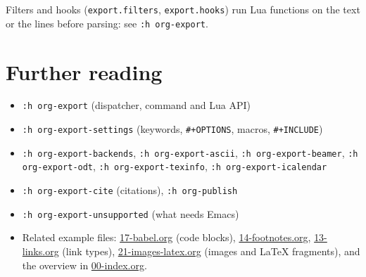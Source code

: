 Filters and hooks (\texttt{export.filters}, \texttt{export.hooks}) run Lua functions on
the text or the lines before parsing: see \texttt{:h org-export}.
\section{Further reading}
\label{sec:org7d8833a}
\begin{itemize}
\item \texttt{:h org-export} (dispatcher, command and Lua API)
\item \texttt{:h org-export-settings} (keywords, \texttt{\#+OPTIONS}, macros, \texttt{\#+INCLUDE})
\item \texttt{:h org-export-backends}, \texttt{:h org-export-ascii}, \texttt{:h org-export-beamer},
\texttt{:h org-export-odt}, \texttt{:h org-export-texinfo}, \texttt{:h org-export-icalendar}
\item \texttt{:h org-export-cite} (citations), \texttt{:h org-publish}
\item \texttt{:h org-export-unsupported} (what needs Emacs)
\item Related example files: \href{17-babel.org}{17-babel.org} (code
blocks), \href{14-footnotes.org}{14-footnotes.org},
\href{13-links.org}{13-links.org} (link types),
\href{21-images-latex.org}{21-images-latex.org} (images and \LaTeX{}
fragments), and the overview in \href{00-index.org}{00-index.org}.
\end{itemize}
